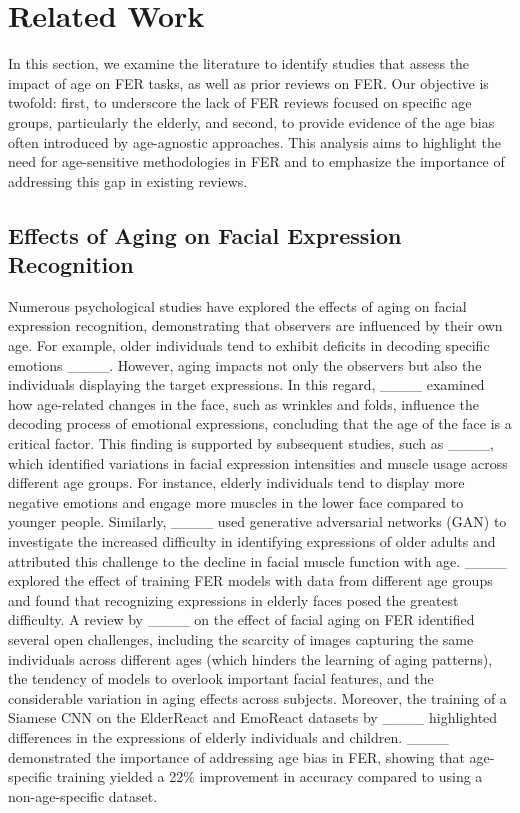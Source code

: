\section{Related Work}
In this section, we examine the literature to identify studies that assess the impact of age on FER tasks, as well as prior reviews on FER. Our objective is twofold: first, to underscore the lack of FER reviews focused on specific age groups, particularly the elderly, and second, to provide evidence of the age bias often introduced by age-agnostic approaches. This analysis aims to highlight the need for age-sensitive methodologies in FER and to emphasize the importance of addressing this gap in existing reviews.

    \subsection{Effects of Aging on Facial Expression Recognition}

        Numerous psychological studies have explored the effects of aging on facial expression recognition, demonstrating that observers are influenced by their own age. For example, older individuals tend to exhibit deficits in decoding specific emotions ____. However, aging impacts not only the observers but also the individuals displaying the target expressions. In this regard, ____ examined how age-related changes in the face, such as wrinkles and folds, influence the decoding process of emotional expressions, concluding that the age of the face is a critical factor. This finding is supported by subsequent studies, such as ____, which identified variations in facial expression intensities and muscle usage across different age groups. For instance, elderly individuals tend to display more negative emotions and engage more muscles in the lower face compared to younger people. Similarly, ____ used generative adversarial networks (GAN) to investigate the increased difficulty in identifying expressions of older adults and attributed this challenge to the decline in facial muscle function with age. ____ explored the effect of training FER models with data from different age groups and found that recognizing expressions in elderly faces posed the greatest difficulty. A review by ____ on the effect of facial aging on FER identified several open challenges, including the scarcity of images capturing the same individuals across different ages (which hinders the learning of aging patterns), the tendency of models to overlook important facial features, and the considerable variation in aging effects across subjects. Moreover, the training of a Siamese CNN on the ElderReact and EmoReact datasets by ____ highlighted differences in the expressions of elderly individuals and children. ____ demonstrated the importance of addressing age bias in FER, showing that age-specific training yielded a 22\% improvement in accuracy compared to using a non-age-specific dataset.

